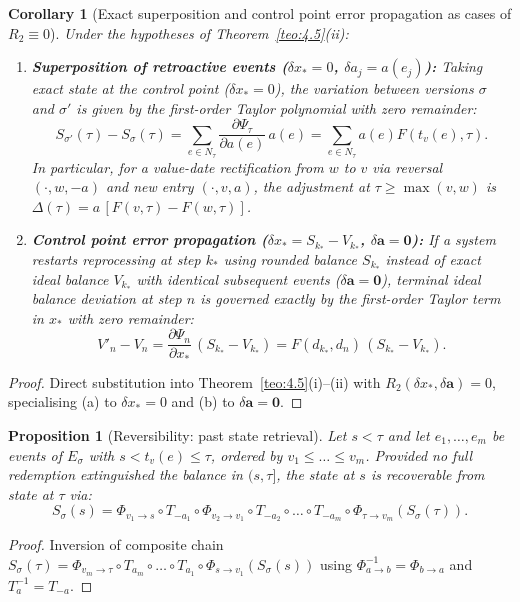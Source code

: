 \documentclass[11pt, a4paper]{article}
\theoremstyle{definition}
\theoremstyle{plain}
\newtheorem{proposicao}[definicao]{Proposition}
\newtheorem{corolario}[definicao]{Corollary}
\theoremstyle{remark}
\begin{document}
\begin{corolario}[Exact superposition and control point error propagation as cases of \texorpdfstring{$R_2 \equiv 0$}{R2 = 0}]\label{cor:4.7}
Under the hypotheses of Theorem~\ref{teo:4.5}(ii):
\begin{enumerate}[label=(\alph*)]
    \item \textbf{Superposition of retroactive events ($\delta x_* = 0$, $\delta a_j = a(e_j)$):} Taking exact state at the control point ($\delta x_* = 0$), the variation between versions $\sigma$ and $\sigma'$ is given by the first-order Taylor polynomial with zero remainder:
    \[
    S_{\sigma'}(\tau) - S_\sigma(\tau) = \sum_{e \in N_\tau} \frac{\partial \Psi_\tau}{\partial a(e)}\,a(e) = \sum_{e \in N_\tau} a(e) F(t_v(e), \tau).
    \]
    In particular, for a value-date rectification from $w$ to $v$ via reversal $(\cdot, w, -a)$ and new entry $(\cdot, v, a)$, the adjustment at $\tau \ge \max(v, w)$ is $\Delta(\tau) = a\,[F(v, \tau) - F(w, \tau)]$.
    \item \textbf{Control point error propagation ($\delta x_* = S_{k_*} - V_{k_*}$, $\delta\mathbf{a} = \mathbf{0}$):} If a system restarts reprocessing at step $k_*$ using rounded balance $S_{k_*}$ instead of exact ideal balance $V_{k_*}$ with identical subsequent events ($\delta\mathbf{a} = \mathbf{0}$), terminal ideal balance deviation at step $n$ is governed exactly by the first-order Taylor term in $x_*$ with zero remainder:
    \[
    V'_n - V_n = \frac{\partial \Psi_n}{\partial x_*}\,(S_{k_*} - V_{k_*}) = F(d_{k_*}, d_n)\,(S_{k_*} - V_{k_*}).
    \]
\end{enumerate}
\end{corolario}
\begin{proof}
Direct substitution into Theorem~\ref{teo:4.5}(i)--(ii) with $R_2(\delta x_*, \delta\mathbf{a}) = 0$, specialising (a) to $\delta x_* = 0$ and (b) to $\delta\mathbf{a} = \mathbf{0}$.
\end{proof}

\begin{proposicao}[Reversibility: past state retrieval]\label{prop:4.8}
Let $s < \tau$ and let $e_1, \dots, e_m$ be events of $E_\sigma$ with $s < t_v(e) \le \tau$, ordered by $v_1 \le \dots \le v_m$. Provided no full redemption extinguished the balance in $(s, \tau]$, the state at $s$ is recoverable from state at $\tau$ via:
\[
S_\sigma(s) = \Phi_{v_1 \to s} \circ T_{-a_1} \circ \Phi_{v_2 \to v_1} \circ T_{-a_2} \circ \dots \circ T_{-a_m} \circ \Phi_{\tau \to v_m}(S_\sigma(\tau)).
\]
\end{proposicao}
\begin{proof}
Inversion of composite chain $S_\sigma(\tau) = \Phi_{v_m \to \tau} \circ T_{a_m} \circ \dots \circ T_{a_1} \circ \Phi_{s \to v_1}(S_\sigma(s))$ using $\Phi_{a \to b}^{-1} = \Phi_{b \to a}$ and $T_a^{-1} = T_{-a}$.
\end{proof}
\end{document}
